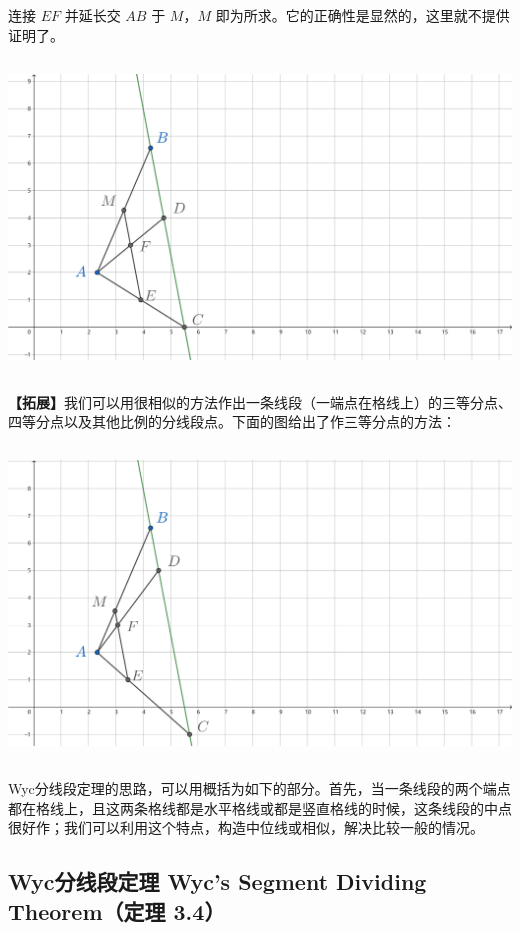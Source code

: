 \documentclass[UTF8]{article}
\begin{document}
连接 \(EF\) 并延长交 \(AB\) 于 \(M\)，\(M\)
即为所求。它的正确性是显然的，这里就不提供证明了。

\includegraphics[width=5.76806in,height=3.27847in]{media/image21.png}

\textbf{【拓展】}我们可以用很相似的方法作出一条线段（一端点在格线上）的三等分点、四等分点以及其他比例的分线段点。下面的图给出了作三等分点的方法：

\includegraphics[width=5.76806in,height=3.27847in]{media/image22.png}

Wyc分线段定理的思路，可以用概括为如下的部分。首先，当一条线段的两个端点都在格线上，且这两条格线都是水平格线或都是竖直格线的时候，这条线段的中点很好作；我们可以利用这个特点，构造中位线或相似，解决比较一般的情况。

\hypertarget{wycux5206ux7ebfux6bb5ux5b9aux7406-wycs-segment-dividing-theoremux5b9aux7406-3.4}{%
\subsection{Wyc分线段定理 Wyc's Segment Dividing Theorem（定理
3.4）}\label{wycux5206ux7ebfux6bb5ux5b9aux7406-wycs-segment-dividing-theoremux5b9aux7406-3.4}}
\end{document}
